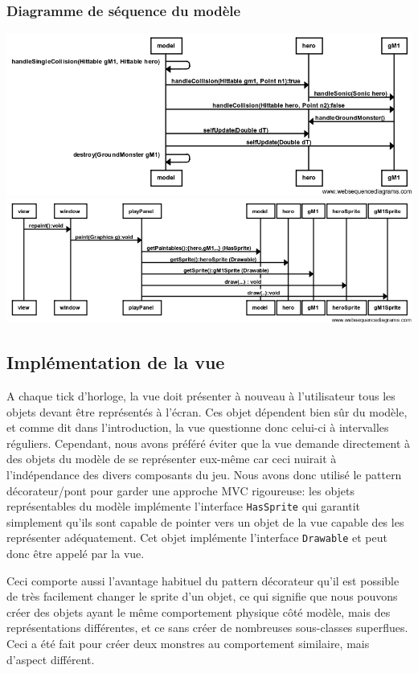 \documentclass[a4paper, 12pt]{article}
\begin{document}
\subsubsection{Diagramme de séquence du modèle}

\includegraphics[width=\textwidth]{diagrammeModel.png}
\includegraphics[width=\textwidth]{diagrammeView.png}


\subsection{Implémentation de la vue}

A chaque tick d'horloge, la vue doit présenter à nouveau à l'utilisateur tous les objets devant être représentés à l'écran. Ces objet dépendent bien sûr du modèle, et comme dit dans l'introduction, la vue questionne donc celui-ci à intervalles réguliers. Cependant, nous avons préféré éviter que la vue demande directement à des objets du modèle de se représenter eux-même car ceci nuirait à l'indépendance des divers composants du jeu. Nous avons donc utilisé le pattern décorateur/pont pour garder une approche MVC rigoureuse: les objets représentables du modèle implémente l'interface {\tt HasSprite} qui garantit simplement qu'ils sont capable de pointer vers un objet de la vue capable des les représenter adéquatement. Cet objet implémente l'interface {\tt Drawable} et peut donc être appelé par la vue.

Ceci comporte aussi l'avantage habituel du pattern décorateur qu'il est possible de très facilement changer le sprite d'un objet, ce qui signifie que nous pouvons créer des objets ayant le même comportement physique côté modèle, mais des représentations différentes, et ce sans créer de nombreuses sous-classes superflues. Ceci a été fait pour créer deux monstres au comportement similaire, mais d'aspect différent.
\end{document}
